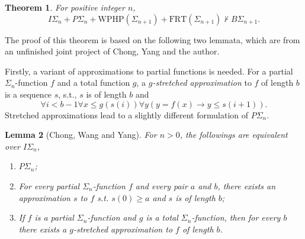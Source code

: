 \documentclass[twoside,a4paper]{amsart}
\newtheorem{theorem}{Theorem}[section]
\newtheorem{lemma}[theorem]{Lemma}
\theoremstyle{definition}
\theoremstyle{theorem}
\numberwithin{equation}{section}
\newcommand{\<}{\langle}
\renewcommand{\>}{\rangle}
\newcommand{\WPHP}{\mathrm{WPHP}}
\newcommand{\FRT}{\mathrm{FRT}}
\begin{document}
\begin{theorem}\label{thm:PSigma}
For positive integer $n$,
\[
  I\Sigma_n + P\Sigma_n + \WPHP(\Sigma_{n+1}) + \FRT(\Sigma_{n+1}) \not\vdash B\Sigma_{n+1}.
\]
\end{theorem}

The proof of this theorem is based on the following two lemmata,
which are from an unfinished joint project of Chong, Yang and the author.

Firstly, a variant of approximations to partial functions is needed.
For a partial $\Sigma_n$-function $f$ and a total function $g$,
 a \emph{$g$-stretched approximation} to $f$ of length $b$ is a sequence $s$,
 s.t., $s$ is of length $b$ and
\[
  \forall i < b-1 \forall x \leq g(s(i)) \forall y(y = f(x) \to y \leq s(i+1)).
\]
Stretched approximations lead to a slightly different formulation of $P\Sigma_n$.

\begin{lemma}[Chong, Wang and Yang]\label{lem:PSigma-variants}
For $n > 0$, the followings are equivalent over $I\Sigma_n$,
\begin{enumerate}
 \item $P\Sigma_n$;
 \item For every partial $\Sigma_n$-function $f$ and every pair $a$ and $b$,
  there exists an approximation $s$ to $f$ s.t. $s(0) \geq a$ and $s$ is of length $b$;
 \item If $f$ is a partial $\Sigma_n$-function and $g$ is a total $\Sigma_n$-function,
  then for every $b$ there exists a $g$-stretched approximation to $f$ of length $b$.
\end{enumerate}
\end{lemma}
\end{document}
